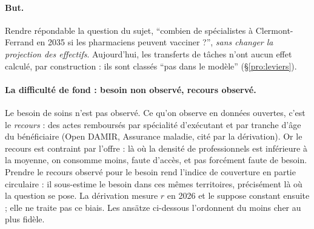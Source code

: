 \paragraph{But.}
Rendre répondable la question du sujet, \enquote{combien de spécialistes à Clermont-Ferrand en 2035 si les pharmaciens peuvent vacciner ?}, \emph{sans changer la projection des effectifs}.
Aujourd'hui, les transferts de tâches n'ont aucun effet calculé, par construction : ils sont classés \enquote{pas dans le modèle} (§\ref{pro:leviers}).

\paragraph{La difficulté de fond : besoin non observé, recours observé.}
Le besoin de soins n'est pas observé. Ce qu'on observe en données ouvertes, c'est le \emph{recours} : des actes remboursés par spécialité d'exécutant et par tranche d'âge du bénéficiaire (Open DAMIR, Assurance maladie, cité par la dérivation).
Or le recours est contraint par l'offre : là où la densité de professionnels est inférieure à la moyenne, on consomme moins, faute d'accès, et pas forcément faute de besoin.
Prendre le recours observé pour le besoin rend l'indice de couverture en partie circulaire : il sous-estime le besoin dans ces mêmes territoires, précisément là où la question se pose.
La dérivation mesure $r$ en 2026 et le suppose constant ensuite ; elle ne traite pas ce biais. Les ansätze ci-dessous l'ordonnent du moins cher au plus fidèle.

